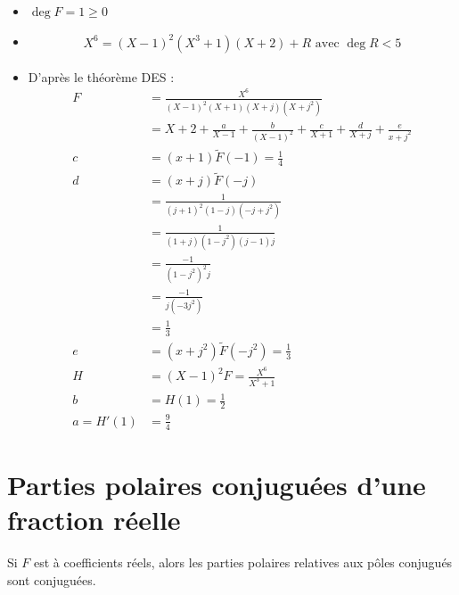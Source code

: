 \documentclass[../main.tex]{subfiles}
\begin{document}
\begin{itemize}
    \item $\deg F = 1 \geq 0$
    \item \begin{align*}
        X^6 = (X-1)^2(X^3 + 1)(X + 2) + R \text{ avec } \deg R < 5
    \end{align*}
    \item D'après le théorème DES : 
    \begin{align*}
        F &= \frac{X^6}{(X - 1)^2(X + 1)(X + j)(X + j^2)} \\
        &= X + 2 + \frac{a}{X - 1} + \frac{b}{(X - 1)^2} + \frac{c}{X + 1} + \frac{d}{X + j} + \frac{e}{x + j^2} \\
        c &= (x+1)\tilde F (-1) = \frac{1}{4} \\
        d &= (x+j)\tilde F (-j) \\
        &= \frac{1}{(j+1)^2(1-j)(-j+j^2)} \\
        &= \frac{1}{(1+j)(1-j^2)(j-1)j} \\
        &= \frac{-1}{(1-j^2)^2j} \\
        &= \frac{-1}{j(-3j^2)} \\
        &= \frac{1}{3} \\
        e &= (x+j^2)\tilde F (-j^2) = \frac{1}{3} \\
        H &= (X-1)^2 F = \frac{X^6}{X^3 + 1} \\
        b &= H(1) = \frac{1}{2} \\
        a = H'(1) &= \frac{9}{4}
    \end{align*}
\end{itemize}

\section{Parties polaires conjuguées d'une fraction réelle}
\begin{tcolorbox}[title=Propostion 17.44, title filled=false, colframe=lightblue, colback=lightblue!10!white]
    Si $F$ est à coefficients réels, alors les parties polaires relatives aux pôles conjugués sont conjuguées. 
\end{tcolorbox}
\end{document}

